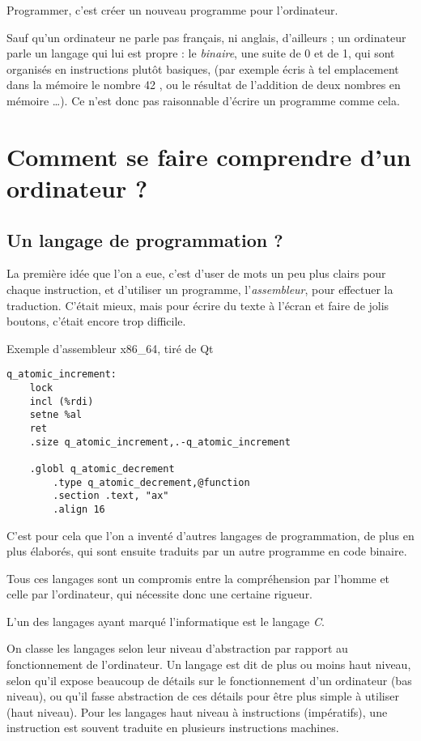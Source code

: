 Programmer, c'est créer un nouveau programme pour l'ordinateur.

Sauf qu'un ordinateur ne parle pas français, ni anglais, d'ailleurs ;
un ordinateur parle un langage qui lui est propre :
le \emph{binaire}, une suite de 0 et de 1,
qui sont organisés en instructions plutôt basiques,
(par exemple \og écris à tel emplacement dans la mémoire le
nombre 42 \fg{}, ou \og le résultat de l'addition de deux nombres en mémoire \fg{}…).
Ce n'est donc pas raisonnable d'écrire un programme comme cela.
\section{Comment se faire comprendre d'un ordinateur ?}
\subsection{Un langage de programmation ?}
La première idée que l'on a eue,
c’est d’user de mots un peu plus clairs pour chaque instruction,
et d'utiliser un programme, l'\emph{assembleur}, pour effectuer la traduction.
C'était mieux, mais pour écrire du texte à l'écran et faire de jolis boutons,
c'était encore trop difficile.
\begin{listing}[h] %
\caption{Exemple d'assembleur x86\_64, tiré de Qt}
\begin{verbatim}
q_atomic_increment:
    lock
    incl (%rdi)
    setne %al
    ret
    .size q_atomic_increment,.-q_atomic_increment

    .globl q_atomic_decrement
        .type q_atomic_decrement,@function
        .section .text, "ax"
        .align 16
\end{verbatim}
\end{listing}

C'est pour cela que l'on a inventé d'autres langages de programmation,
de plus en plus élaborés,
qui sont ensuite traduits par un autre programme en code binaire.

Tous ces langages sont un compromis entre la compréhension par l'homme et celle par l'ordinateur, qui nécessite donc une certaine rigueur.

L'un des langages ayant marqué l'informatique est le langage \emph{C}.

On classe les langages selon leur niveau d'abstraction
par rapport au fonctionnement de l'ordinateur.
Un langage est dit de plus ou moins haut niveau,
selon qu'il expose beaucoup de détails sur le fonctionnement d'un ordinateur (bas niveau),
ou qu'il fasse abstraction de ces détails pour être plus simple à utiliser (haut niveau).
Pour les langages haut niveau à instructions (impératifs),
une instruction est souvent traduite en plusieurs instructions machines.

